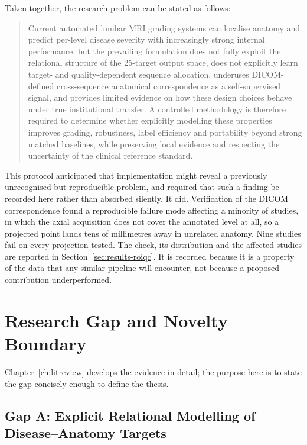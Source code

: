 Taken together, the research problem can be stated as follows:

\begin{quote}
Current automated lumbar MRI grading systems can localise anatomy and predict
per-level disease severity with increasingly strong internal performance, but the
prevailing formulation does not fully exploit the relational structure of the
25-target output space, does not explicitly learn target- and quality-dependent
sequence allocation, underuses DICOM-defined cross-sequence anatomical
correspondence as a self-supervised signal, and provides limited evidence on how
these design choices behave under true institutional transfer. A controlled
methodology is therefore required to determine whether explicitly modelling these
properties improves grading, robustness, label efficiency and portability beyond
strong matched baselines, while preserving local evidence and respecting the
uncertainty of the clinical reference standard.
\end{quote}

This protocol anticipated that implementation might reveal a previously
unrecognised but reproducible problem, and required that such a finding be
recorded here rather than absorbed silently. It did. Verification of the DICOM
correspondence found a reproducible failure mode affecting a minority of studies,
in which the axial acquisition does not cover the annotated level at all, so a
projected point lands tens of millimetres away in unrelated anatomy. Nine studies
fail on every projection tested. The check, its distribution and the affected
studies are reported in Section~\ref{sec:results-roiqc}. It is recorded because
it is a property of the data that any similar pipeline will encounter, not
because a proposed contribution underperformed.

\section{Research Gap and Novelty Boundary}
\label{sec:intro-gap}

Chapter~\ref{ch:litreview} develops the evidence in detail; the purpose here is to
state the gap concisely enough to define the thesis.

\subsection{Gap A: Explicit Relational Modelling of Disease--Anatomy Targets}
\label{sec:intro-gap-graph}

